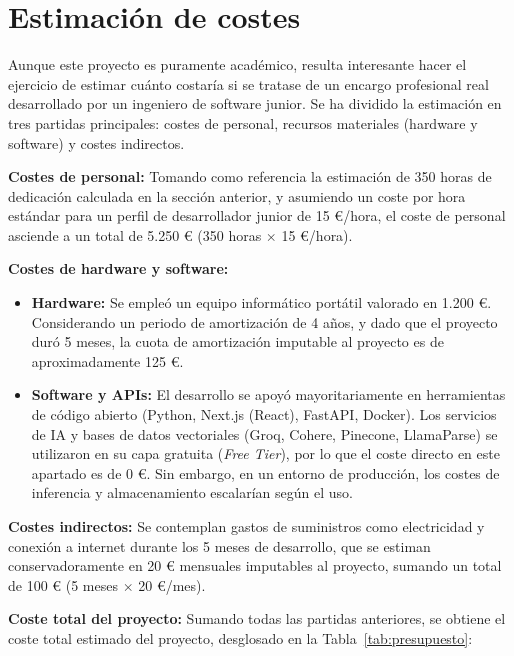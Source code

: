 \documentclass[12pt,a4paper,oneside]{report}
\begin{document}
\section{Estimación de costes}

Aunque este proyecto es puramente académico, resulta interesante hacer el ejercicio de estimar cuánto costaría si se tratase de un encargo profesional real desarrollado por un ingeniero de software junior. Se ha dividido la estimación en tres partidas principales: costes de personal, recursos materiales (hardware y software) y costes indirectos.

\textbf{Costes de personal:} Tomando como referencia la estimación de 350 horas de dedicación calculada en la sección anterior, y asumiendo un coste por hora estándar para un perfil de desarrollador junior de 15 €/hora, el coste de personal asciende a un total de 5.250 € (350 horas $\times$ 15 €/hora).

\textbf{Costes de hardware y software:} 
\begin{itemize}
    \item \textbf{Hardware:} Se empleó un equipo informático portátil valorado en 1.200 €. Considerando un periodo de amortización de 4 años, y dado que el proyecto duró 5 meses, la cuota de amortización imputable al proyecto es de aproximadamente 125 €.
    \item \textbf{Software y APIs:} El desarrollo se apoyó mayoritariamente en herramientas de código abierto (Python, Next.js (React), FastAPI, Docker). Los servicios de IA y bases de datos vectoriales (Groq, Cohere, Pinecone, LlamaParse) se utilizaron en su capa gratuita (\textit{Free Tier}), por lo que el coste directo en este apartado es de 0 €. Sin embargo, en un entorno de producción, los costes de inferencia y almacenamiento escalarían según el uso.
\end{itemize}

\textbf{Costes indirectos:} Se contemplan gastos de suministros como electricidad y conexión a internet durante los 5 meses de desarrollo, que se estiman conservadoramente en 20 € mensuales imputables al proyecto, sumando un total de 100 € (5 meses $\times$ 20 €/mes).

\textbf{Coste total del proyecto:} Sumando todas las partidas anteriores, se obtiene el coste total estimado del proyecto, desglosado en la Tabla~\ref{tab:presupuesto}:
\end{document}
